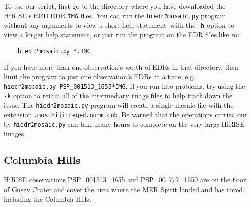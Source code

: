 To use our script, first go to the directory where you have downloaded
the HiRISE's RED EDR \texttt{IMG} files. You can run the
\texttt{hiedr2mosaic.py} program without any arguments to view a short
help statement, with the \texttt{-h} option to view a longer help statement,
or just run the program on the EDR files like so:

\begin{verbatim}
    hiedr2mosaic.py *.IMG
\end{verbatim}

If you have more than one observation's worth of EDRs in that
directory, then limit the program to just one observation's EDRs
at a time, e.g. \texttt{hiedr2mosaic.py PSP\_001513\_1655*IMG}.  If you
run into problems, try using the \texttt{-k} option to retain all of
the intermediary image files to help track down the issue.  The
\texttt{hiedr2mosaic.py} program will create a single mosaic file
with the extension \texttt{.mos\_hijitreged.norm.cub}.  Be warned that
the operations carried out by \texttt{hiedr2mosaic.py} can take many
hours to complete on the very large HiRISE images.

\subsection{Columbia Hills}


\ac{HiRISE} observations
\href{http://hirise.lpl.arizona.edu/PSP_001513_1655}{PSP\_001513\_1655} and
\href{http://hirise.lpl.arizona.edu/PSP_001777_1650}{PSP\_001777\_1650}
are on the floor of Gusev Crater and cover the area where the \ac{MER}
Spirit landed and has roved, including the Columbia Hills.

